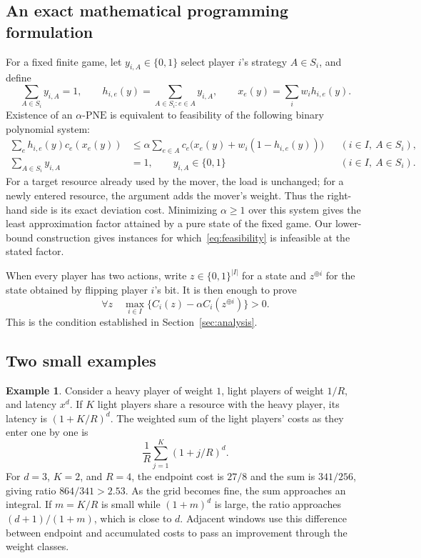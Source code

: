 \documentclass[11pt]{article}
\theoremstyle{definition}
\newtheorem{example}[theorem]{Example}
\newcommand{\PNE}{\mathrm{PNE}}
\newcommand{\xor}{\mathbin{\oplus}}
\begin{document}
\subsection{An exact mathematical programming formulation}
For a fixed finite game, let $y_{i,A}\in\{0,1\}$ select player $i$'s strategy $A\in S_i$, and define
\[
 \sum_{A\in S_i}y_{i,A}=1,\qquad
 h_{i,e}(y)=\sum_{A\in S_i:e\in A}y_{i,A},\qquad
 x_e(y)=\sum_iw_i h_{i,e}(y).
\]
Existence of an $\alpha$-$\PNE$ is equivalent to feasibility of the following binary polynomial system:
\begin{equation}\label{eq:feasibility}
\begin{aligned}
 \sum_e h_{i,e}(y)c_e(x_e(y))
 &\le \alpha\sum_{e\in A}
 c_e\bigl(x_e(y)+w_i(1-h_{i,e}(y))\bigr)
 &&(i\in I,\ A\in S_i),\\
 \sum_{A\in S_i}y_{i,A}&=1,
 \qquad y_{i,A}\in\{0,1\}
 &&(i\in I,\ A\in S_i).
\end{aligned}
\end{equation}
For a target resource already used by the mover, the load is unchanged; for a newly entered resource, the argument adds the mover's weight. Thus the right-hand side is its exact deviation cost. Minimizing $\alpha\ge1$ over this system gives the least approximation factor attained by a pure state of the fixed game. Our lower-bound construction gives instances for which~\eqref{eq:feasibility} is infeasible at the stated factor.

When every player has two actions, write $z\in\{0,1\}^{|I|}$ for a state and $z^{\xor i}$ for the state obtained by flipping player $i$'s bit. It is then enough to prove
\[
 \forall z\quad\max_{i\in I}
 \bigl\{C_i(z)-\alpha C_i(z^{\xor i})\bigr\}>0.
\]
This is the condition established in Section~\ref{sec:analysis}.

\subsection{Two small examples}
\begin{example}\label{ex:window}
Consider a heavy player of weight $1$, light players of weight $1/R$, and latency $x^d$. If $K$ light players share a resource with the heavy player, its latency is $(1+K/R)^d$. The weighted sum of the light players' costs as they enter one by one is
\[
 \frac1R\sum_{j=1}^K(1+j/R)^d.
\]
For $d=3$, $K=2$, and $R=4$, the endpoint cost is $27/8$ and the sum is $341/256$, giving ratio $864/341>2.53$. As the grid becomes fine, the sum approaches an integral. If $m=K/R$ is small while $(1+m)^d$ is large, the ratio approaches $(d+1)/(1+m)$, which is close to $d$. Adjacent windows use this difference between endpoint and accumulated costs to pass an improvement through the weight classes.
\end{example}
\end{document}
